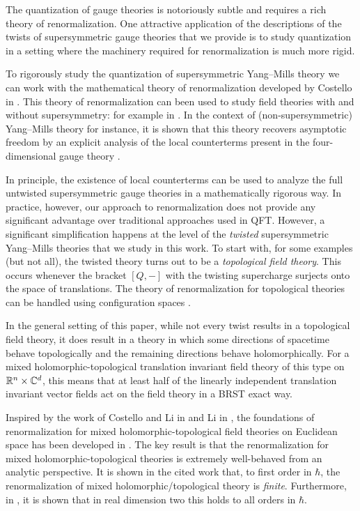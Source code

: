 \documentclass[10pt, oneside]{article}
\begin{document}
The quantization of gauge theories is notoriously subtle and requires a rich theory of renormalization.  One attractive application of the descriptions of the twists of supersymmetric gauge theories that we provide is to study quantization in a setting where the machinery required for renormalization is much more rigid.

To rigorously study the quantization of supersymmetric Yang--Mills theory we can work with the mathematical theory of renormalization developed by Costello in \cite{CostelloBook}. This theory of renormalization can been used to study field theories with and without supersymmetry: for example in \cite{CostelloWittengenus, LiLi, BCOV1, ChanLeungLi, GradyLiLi}. In the context of (non-supersymmetric) Yang--Mills theory for instance, it is shown that this theory recovers asymptotic freedom by an explicit analysis of the local counterterms present in the four-dimensional gauge theory \cite{EWY}.  

In principle, the existence of local counterterms can be used to analyze the full untwisted supersymmetric gauge theories in a mathematically rigorous way.  In practice, however, our approach to renormalization does not provide any significant advantage over traditional approaches used in QFT.  However, a significant simplification happens at the level of the {\em twisted} supersymmetric Yang--Mills theories that we study in this work. To start with, for some examples (but not all), the twisted theory turns out to be a {\em topological field theory}.  This occurs whenever the bracket $[Q,-]$ with the twisting supercharge surjects onto the space of translations. The theory of renormalization for topological theories can be handled using configuration spaces \cite{Kontsevich, AxelrodSinger}. 

In the general setting of this paper, while not every twist results in a topological field theory, it does result in a theory in which some directions of spacetime behave topologically and the remaining directions behave holomorphically. For a mixed holomorphic-topological translation invariant field theory of this type on $\mathbb R^n \times \mathbb C^d$, this means that at least half of the linearly independent translation invariant vector fields act on the field theory in a BRST exact way.

Inspired by the work of Costello and Li in \cite{BCOV1} and Li in \cite{LiFeynman, LiVertex}, the foundations of renormalization for mixed holomorphic-topological field theories on Euclidean space has been developed in \cite{BWhol}. The key result is that the renormalization for mixed holomorphic-topological theories is extremely well-behaved from an analytic perspective. It is shown in the cited work that, to first order in $\hbar$, the renormalization of mixed holomorphic/topological theory is {\em finite}. Furthermore, in \cite{LiVertex}, it is shown that in real dimension two this holds to all orders in $\hbar$. 
\end{document}
